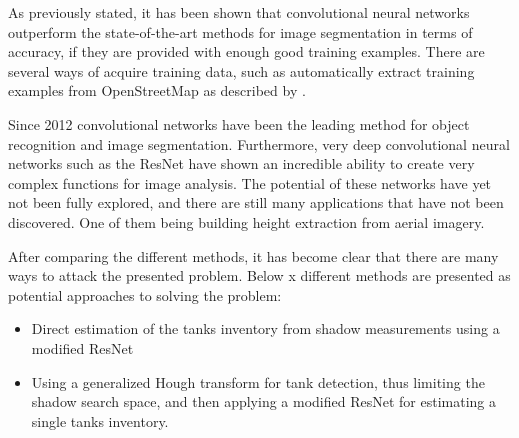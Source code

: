 As previously stated, it has been shown that convolutional neural networks outperform the state-of-the-art methods for image segmentation in terms of accuracy, if they are provided with enough good training examples. There are several ways of acquire training data, such as automatically extract training examples from OpenStreetMap as described by \cite{Kaiser2017}. 

Since 2012 convolutional networks have been the leading method for object recognition and image segmentation. Furthermore, very deep convolutional neural networks such as the ResNet \citep{Wu2017} have shown an incredible ability to create very complex functions for image analysis. The potential of these networks have yet not been fully explored, and there are still many applications that have not been discovered. One of them being building height extraction from aerial imagery.

After comparing the different methods, it has become clear that there are many ways to attack the presented problem. Below x different methods are presented as potential approaches to solving the problem:

\begin{itemize}
    \item Direct estimation of the tanks inventory from shadow measurements using a modified ResNet
    \item Using a generalized Hough transform for tank detection, thus limiting the shadow search space, and then applying a modified ResNet for estimating a single tanks inventory.
\end{itemize}